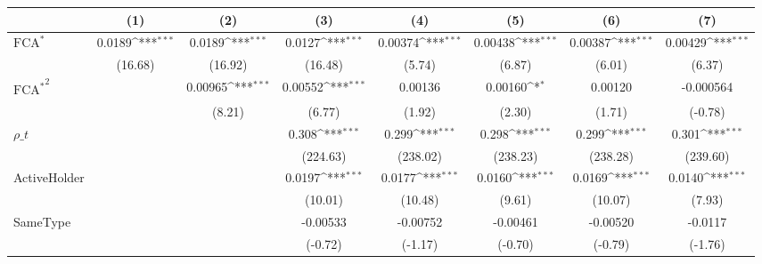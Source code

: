 {
\def\sym#1{\ifmmode^{#1}\else\(^{#1}\)\fi}
\begin{tabular}{l*{7}{c}}
\hline\hline
                    &\multicolumn{1}{c}{(1)}         &\multicolumn{1}{c}{(2)}         &\multicolumn{1}{c}{(3)}         &\multicolumn{1}{c}{(4)}         &\multicolumn{1}{c}{(5)}         &\multicolumn{1}{c}{(6)}         &\multicolumn{1}{c}{(7)}         \\
\hline
$ \text{FCA}^* $    &      0.0189\sym{***}&      0.0189\sym{***}&      0.0127\sym{***}&     0.00374\sym{***}&     0.00438\sym{***}&     0.00387\sym{***}&     0.00429\sym{***}\\
                    &     (16.68)         &     (16.92)         &     (16.48)         &      (5.74)         &      (6.87)         &      (6.01)         &      (6.37)         \\
[1em]
 $ { \text{FCA} ^ * } ^2 $&                     &     0.00965\sym{***}&     0.00552\sym{***}&     0.00136         &     0.00160\sym{*}  &     0.00120         &   -0.000564         \\
                    &                     &      (8.21)         &      (6.77)         &      (1.92)         &      (2.30)         &      (1.71)         &     (-0.78)         \\
[1em]
$ \rho\_t $          &                     &                     &       0.308\sym{***}&       0.299\sym{***}&       0.298\sym{***}&       0.299\sym{***}&       0.301\sym{***}\\
                    &                     &                     &    (224.63)         &    (238.02)         &    (238.23)         &    (238.28)         &    (239.60)         \\
[1em]
ActiveHolder        &                     &                     &      0.0197\sym{***}&      0.0177\sym{***}&      0.0160\sym{***}&      0.0169\sym{***}&      0.0140\sym{***}\\
                    &                     &                     &     (10.01)         &     (10.48)         &      (9.61)         &     (10.07)         &      (7.93)         \\
[1em]
SameType            &                     &                     &    -0.00533         &    -0.00752         &    -0.00461         &    -0.00520         &     -0.0117         \\
                    &                     &                     &     (-0.72)         &     (-1.17)         &     (-0.70)         &     (-0.79)         &     (-1.76)         \\

\end{tabular}}
